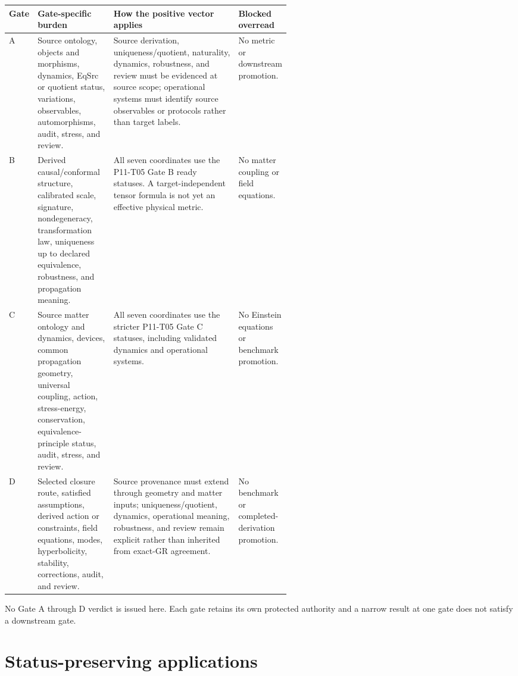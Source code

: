 \documentclass[11pt]{article}
\begin{document}
\begin{center}
\small
\begin{tabularx}{\textwidth}{>{\raggedright\arraybackslash}p{0.10\linewidth}>{\raggedright\arraybackslash}p{0.27\linewidth}>{\raggedright\arraybackslash}X>{\raggedright\arraybackslash}p{0.18\linewidth}}
\toprule
Gate & Gate-specific burden & How the positive vector applies & Blocked overread \\
\midrule
A & Source ontology, objects and morphisms, dynamics, EqSrc or quotient status, variations, observables, automorphisms, audit, stress, and review. & Source derivation, uniqueness/quotient, naturality, dynamics, robustness, and review must be evidenced at source scope; operational systems must identify source observables or protocols rather than target labels. & No metric or downstream promotion. \\
B & Derived causal/conformal structure, calibrated scale, signature, nondegeneracy, transformation law, uniqueness up to declared equivalence, robustness, and propagation meaning. & All seven coordinates use the P11-T05 Gate B ready statuses.  A target-independent tensor formula is not yet an effective physical metric. & No matter coupling or field equations. \\
C & Source matter ontology and dynamics, devices, common propagation geometry, universal coupling, action, stress-energy, conservation, equivalence-principle status, audit, stress, and review. & All seven coordinates use the stricter P11-T05 Gate C statuses, including validated dynamics and operational systems. & No Einstein equations or benchmark promotion. \\
D & Selected closure route, satisfied assumptions, derived action or constraints, field equations, modes, hyperbolicity, stability, corrections, audit, and review. & Source provenance must extend through geometry and matter inputs; uniqueness/quotient, dynamics, operational meaning, robustness, and review remain explicit rather than inherited from exact-GR agreement. & No benchmark or completed-derivation promotion. \\
\bottomrule
\end{tabularx}
\end{center}

No Gate A through D verdict is issued here.  Each gate retains its own protected
authority and a narrow result at one gate does not satisfy a downstream gate.

\section{Status-preserving applications}
\end{document}
